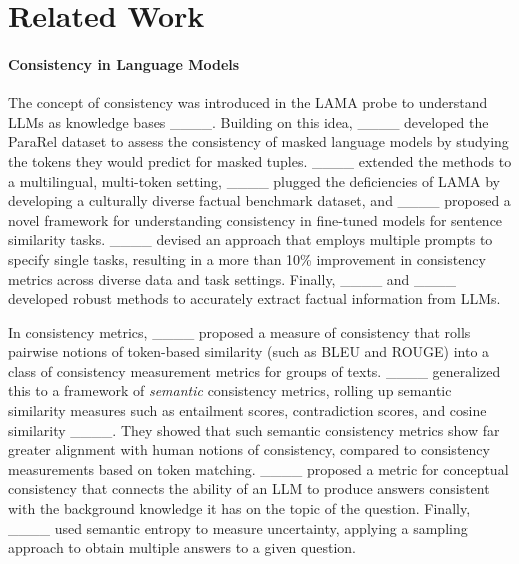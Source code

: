 \section{Related Work}
\paragraph{Consistency in Language Models}
The concept of consistency was introduced in the LAMA probe to understand LLMs as knowledge bases ____. Building on this idea, ____ developed the ParaRel dataset to assess the consistency of masked language models by studying the tokens they would predict for masked tuples. ____ extended the methods to a multilingual, multi-token setting, ____ plugged the deficiencies of LAMA by developing a culturally diverse factual benchmark dataset, and ____ proposed a novel framework for understanding consistency in fine-tuned models for sentence similarity tasks. ____ devised an approach that employs multiple prompts to specify single tasks, resulting in a more than 10\% improvement in consistency metrics across diverse data and task settings. Finally, ____ and ____ developed robust methods to accurately extract factual information from LLMs.

In consistency metrics, ____ proposed a measure of consistency that rolls pairwise notions of token-based similarity (such as BLEU and ROUGE) into a class of consistency measurement metrics for groups of texts. ____ generalized this to a framework of {\it semantic} consistency metrics, rolling up semantic similarity measures such as entailment scores, contradiction scores, and cosine similarity ____. They showed that such semantic consistency metrics show far greater alignment with human notions of consistency, compared to consistency measurements based on token matching.  ____ proposed a metric for conceptual consistency that connects the ability of an LLM to produce answers consistent with the background knowledge it has on the topic of the question. Finally, ____ used semantic entropy to measure uncertainty, applying a sampling approach to obtain multiple answers to a given question. 

